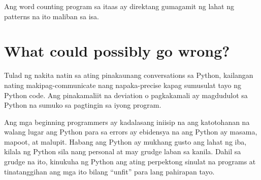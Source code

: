 \documentclass[10pt,]{book}
\begin{document}
Ang word counting program sa itaas ay direktang gumagamit ng lahat ng
patterns na ito maliban sa isa.

\section{What could possibly go
wrong?}\label{what-could-possibly-go-wrong}

Tulad ng nakita natin sa ating pinakaunang conversations sa Python,
kailangan nating makipag-communicate nang napaka-precise kapag sumusulat
tayo ng Python code. Ang pinakamaliit na deviation o pagkakamali ay
magdudulot sa Python na sumuko sa pagtingin sa iyong program.

Ang mga beginning programmers ay kadalasang iniisip na ang katotohanan
na walang lugar ang Python para sa errors ay ebidensya na ang Python ay
masama, mapoot, at malupit. Habang ang Python ay mukhang gusto ang lahat
ng iba, kilala ng Python sila nang personal at may grudge laban sa
kanila. Dahil sa grudge na ito, kinukuha ng Python ang ating perpektong
sinulat na programs at tinatanggihan ang mga ito bilang ``unfit'' para
lang pahirapan tayo.
\end{document}
